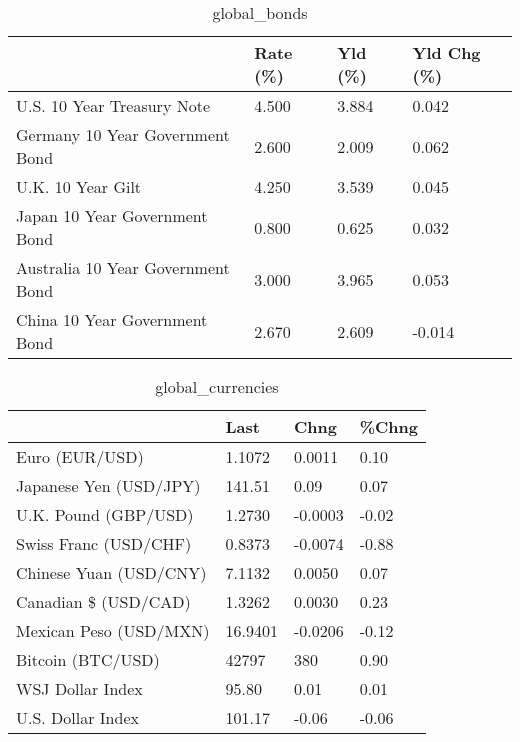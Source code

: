 \documentclass{article}%
\begin{document}
%


\begin{table}[htbp]%
\caption{global\_bonds}%
\centering%
\begin{adjustbox}{width=1\textwidth}%
\begin{tabular}{llll}
\toprule
                                  & Rate (\%) & Yld (\%) & Yld Chg (\%) \\
\midrule
       U.S. 10 Year Treasury Note &    4.500 &   3.884 &       0.042 \\
  Germany 10 Year Government Bond &    2.600 &   2.009 &       0.062 \\
                U.K. 10 Year Gilt &    4.250 &   3.539 &       0.045 \\
    Japan 10 Year Government Bond &    0.800 &   0.625 &       0.032 \\
Australia 10 Year Government Bond &    3.000 &   3.965 &       0.053 \\
    China 10 Year Government Bond &    2.670 &   2.609 &      -0.014 \\
\bottomrule
\end{tabular}
%
\end{adjustbox}%
\end{table}

%


\begin{table}[htbp]%
\caption{global\_currencies}%
\centering%
\begin{adjustbox}{width=1\textwidth}%
\begin{tabular}{llll}
\toprule
                       &    Last &    Chng & \%Chng \\
\midrule
        Euro (EUR/USD) &  1.1072 &  0.0011 &  0.10 \\
Japanese Yen (USD/JPY) &  141.51 &    0.09 &  0.07 \\
  U.K. Pound (GBP/USD) &  1.2730 & -0.0003 & -0.02 \\
 Swiss Franc (USD/CHF) &  0.8373 & -0.0074 & -0.88 \\
Chinese Yuan (USD/CNY) &  7.1132 &  0.0050 &  0.07 \\
  Canadian \$ (USD/CAD) &  1.3262 &  0.0030 &  0.23 \\
Mexican Peso (USD/MXN) & 16.9401 & -0.0206 & -0.12 \\
     Bitcoin (BTC/USD) &   42797 &     380 &  0.90 \\
      WSJ Dollar Index &   95.80 &    0.01 &  0.01 \\
     U.S. Dollar Index &  101.17 &   -0.06 & -0.06 \\
\bottomrule
\end{tabular}
%
\end{adjustbox}%
\end{table}
\end{document}
